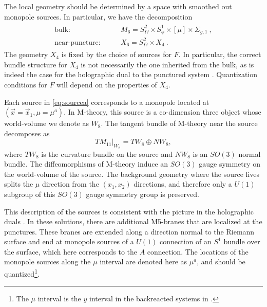 \documentclass[a4paper,11pt]{article}
\newcommand{\ba}[1]{\begin{align} #1 \end{align} }
\newcommand{\bs}[1]{\begin{split} #1 \end{split} }
\begin{document}
The local geometry should be determined by a space with smoothed out monopole sources. In particular, we have the decomposition
		\ba{\bs{
	\text{bulk:}&\qquad {M}_6 = S^2_\Omega\times S^1_\phi   \times [\mu]\times \Sigma_{g,1}\ ,\\
	\text{near-puncture:}& \qquad X_6 = S^2_\Omega \times X_4\  .
	}\label{eq:bundlesplit}}
The geometry $X_4$ is fixed by the choice of sources for $F$. In particular, the correct bundle structure for $X_4$ is not necessarily the one inherited from the bulk, as is indeed the case for the holographic dual to the punctured system  \cite{Gaiotto:2009gz}.  Quantization conditions for $F$ will depend on the properties of $X_4$. 


Each source in \eqref{eq:sourcea} corresponds to a monopole located at $\left(\vec{x} =\vec{x}_1, \mu = \mu^a\right)$.  In M-theory, this source is a co-dimension three object whose world-volume we denote as $W_8$.  The tangent bundle of M-theory near the source decomposes as
\begin{equation}
TM_{11}|_{W_8} = TW_8 \oplus NW_8, \label{eq:splitting}
\end{equation} where $TW_8$ is the curvature bundle on the source and $NW_8$ is an $SO(3)$ normal bundle.  The diffeomorphisms of M-theory induce an $SO(3)$ gauge symmetry on the world-volume of the source.  The background geometry where the source lives splits the $\mu$ direction from the $(x_1, x_2)$ directions, and therefore only a $U(1)$ subgroup of this $SO(3)$ gauge symmetry group is preserved.    

This description of the sources is consistent with the picture in the holographic duals \cite{Gaiotto:2009gz,Bah:2015fwa}. In these solutions, there are additional M5-branes that are localized at the punctures.  These branes are extended along a direction normal to the Riemann surface and end at monopole sources of a $U(1)$ connection of an $S^1$ bundle over the  surface, which here corresponds to the $A$ connection. The locations of the monopole sources along the $\mu$ interval are denoted here as $\mu^a$, and should be quantized\footnote{The $\mu$ interval is the $y$ interval in the backreacted systems in \cite{Gaiotto:2009gz}.}. 
\end{document}
